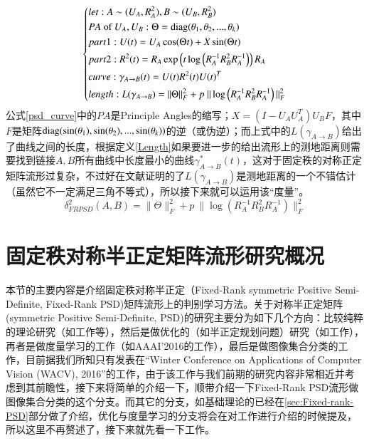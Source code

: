 \begin{equation}
\label{psd_curve}
\left\{
\begin{aligned}
&let:A\sim(U_A,R_{A}^{2}),B\sim(U_B,R_{B}^{2})\\
&PA\text{ of }U_A,U_B:\Theta={\rm diag}(\theta_1,\theta_2,...,\theta_k)\\
&part1:U(t)=U_A\cos(\Theta t)+X\sin(\Theta t)\\
&part2:R^2(t)=R_{A}\exp\left(t\log\left(R_{A}^{-1}R_{B}^{2}R_{A}^{-1}\right)\right)R_{A}\\
&curve:\gamma_{A \rightarrow B}(t)=U(t)R^{2}(t)U(t)^{T}\\
&length:L(\gamma_{A \rightarrow B})=\|\Theta\|_{F}^{2}+p~\|\log\left(R_{A}^{-1}R_{B}^{2}R_{A}^{-1}\right)\|_{F}^{2}
\end{aligned}
\right.
\end{equation}
公式\ref{psd_curve}中的$PA$是Principle Angles的缩写；$X=(I-U_AU_{A}^{T})U_BF$，其中$F$是矩阵${\rm diag}(\sin(\theta_1),\sin(\theta_2),...,\sin(\theta_k))$的逆（或伪逆）；而上式中的$L(\gamma_{A \rightarrow B})$给出了曲线之间的长度，根据定义\ref{Length}如果要进一步的给出流形上的测地距离则需要找到链接$A,B$所有曲线中长度最小的曲线$\gamma_{A \rightarrow B}^{*}(t)$，这对于固定秩的对称正定矩阵流形过复杂，不过好在文献\cite{PSD_Riemannian}证明的了$L(\gamma_{A \rightarrow B})$是测地距离的一个不错估计（虽然它不一定满足三角不等式），所以接下来就可以运用该“度量”。
\begin{equation}
\label{polar_metric}
\delta^{2}_{FRPSD}(A,B)=\|\Theta\|_{F}^{2}+p~\|\log\left(R_{A}^{-1}R_{B}^{2}R_{A}^{-1}\right)\|_{F}^{2}
\end{equation}
\section{固定秩对称半正定矩阵流形研究概况}
\label{sec:Fixed-Rank-PSD-Current}
本节的主要内容是介绍固定秩对称半正定（Fixed-Rank symmetric Positive Semi-Definite, Fixed-Rank PSD)矩阵流形上的判别学习方法。关于对称半正定矩阵(symmetric Positive Semi-Definite, PSD)的研究主要分为如下几个方向：比较纯粹的理论研究（如工作\cite{PSD_Riemannian,PSD_Regression}等），然后是做优化的（如半正定规划问题）研究（如工作\cite{PSD_Opt1}），再者是做度量学习的工作（如AAAI'2016的工作\cite{PSD_AAAI}），最后是做图像集合分类的工作，目前据我们所知只有发表在“Winter Conference on Applications of Computer Vision (WACV), 2016”的工作\cite{PSD_WACV}，由于该工作与我们前期的研究内容非常相近并考虑到其前瞻性，接下来将简单的介绍一下，顺带介绍一下Fixed-Rank PSD流形做图像集合分类的这个分支。而其它的分支，如基础理论的已经在\ref{sec:Fixed-rank-PSD}部分做了介绍，优化与度量学习的分支将会在对工作\cite{PSD_AAAI}进行介绍的时候提及，所以这里不再赘述了，接下来就先看一下工作\cite{PSD_WACV}。

